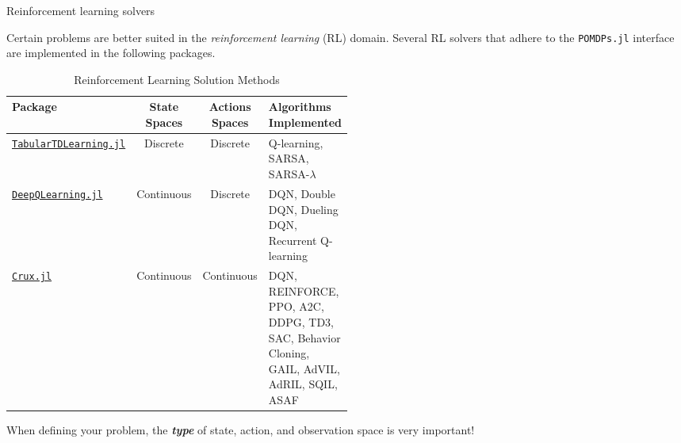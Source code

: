 \begin{frame}{Reinforcement learning solvers}

{\small Certain problems are better suited in the \textit{reinforcement learning} (RL) domain. Several RL solvers that adhere to the \texttt{POMDPs.jl} interface are implemented in the following packages.}

\begin{table}[!t]
    {\tiny
    \centering
    \caption{\label{tab:solutions} Reinforcement Learning Solution Methods}
    \begin{threeparttable}
    \begin{tabular}{lccp{0.5\linewidth}}
        \toprule
        \textbf{Package} & \textbf{State Spaces} & \textbf{Actions Spaces} & \textbf{Algorithms Implemented} \\
        \midrule
        \href{https://github.com/JuliaPOMDP/TabularTDLearning.jl}{\texttt{TabularTDLearning.jl}} & Discrete & Discrete & Q-learning, SARSA, SARSA-$\lambda$ \\
        \href{https://github.com/JuliaPOMDP/DeepQLearning.jl}{\texttt{DeepQLearning.jl}} & Continuous & Discrete & DQN, Double DQN, Dueling DQN, Recurrent Q-learning\\
        \href{https://github.com/ancorso/Crux.jl}{\texttt{Crux.jl}} & Continuous & Continuous & DQN, REINFORCE, PPO, A2C, DDPG, TD3, SAC, Behavior Cloning, GAIL, AdVIL, AdRIL, SQIL, ASAF\\
        \bottomrule
    \end{tabular}
    \end{threeparttable}
    }
\end{table}

{\footnotesize
\begin{importantblock}
When defining your problem, the \textbf{\textit{type}} of state, action, and observation space is very important!
\end{importantblock}
}

\end{frame}

